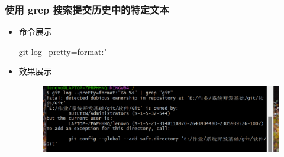 \documentclass[UTF8]{ctexart}
\begin{document}
\subsubsection{使用 grep 搜索提交历史中的特定文本}
\begin{itemize}
  \item 命令展示
 
    git log --pretty=format:"%

\item 效果展示
  \begin{figure}[H]
\includegraphics[width=1\textwidth]{11}
\end{figure}
\end{itemize}
\end{document}
